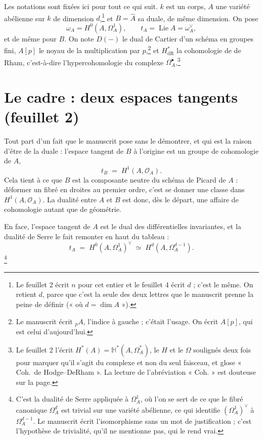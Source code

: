 \documentclass[11pt,a4paper]{article}
\begin{document}
Les notations sont fixées ici pour tout ce qui suit. $k$ est un corps, $A$ une
variété abélienne sur $k$ de dimension $d$,\footnote{Le feuillet 2 écrit $n$
pour cet entier et le feuillet 4 écrit $d$ ; c'est le même. On retient $d$,
parce que c'est la seule des deux lettres que le manuscrit prenne la peine de
définir (« où $d = \dim A$ »).} et $B = \widehat{A}$ sa duale, de même
dimension. On pose
\[
  \omega_A = H^0(A, \Omega^1_A), \qquad t_A = \operatorname{Lie} A = \omega_A^{\vee},
\]
et de même pour $B$. On note $D(-)$ le dual de Cartier d'un schéma en groupes
fini, $A[p]$ le noyau de la multiplication par $p$,\footnote{Le manuscrit écrit
${}_pA$, l'indice à gauche ; c'était l'usage. On écrit $A[p]$, qui est celui
d'aujourd'hui.} et $H^{*}_{\mathrm{dR}}$ la cohomologie de de Rham, c'est-à-dire
l'hypercohomologie du complexe $\Omega^{\bullet}_A$.\footnote{Le feuillet 2
l'écrit $H^{*}(A) = \mathbb{H}^{*}(A, \Omega^{*}_A)$, le $H$ et le $\Omega$
soulignés deux fois pour marquer qu'il s'agit du complexe et non du seul
faisceau, et glose « Coh.\ de Hodge--DeRham ». La lecture de l'abréviation
« Coh. » est douteuse sur la page.}

\section*{Le cadre : deux espaces tangents (feuillet 2)}

Tout part d'un fait que le manuscrit pose sans le démontrer, et qui est la
raison d'être de la duale : l'espace tangent de $B$ à l'origine est un groupe
de cohomologie de $A$,
\[
  t_B \;=\; H^1(A, \mathcal{O}_A).
\]
Cela tient à ce que $B$ est la composante neutre du schéma de Picard de $A$ :
déformer un fibré en droites au premier ordre, c'est se donner une
classe dans $H^1(A, \mathcal{O}_A)$. La dualité entre $A$ et $B$ est donc, dès
le départ, une affaire de cohomologie autant que de géométrie.

En face, l'espace tangent de $A$ est le dual des différentielles invariantes,
et la dualité de Serre le fait remonter en haut du tableau :
\[
  t_A \;=\; H^0(A, \Omega^1_A)^{\vee} \;\simeq\; H^d(A, \Omega^{d-1}_A).
\]
\footnote{C'est la dualité de Serre appliquée à $\Omega^1_A$, où l'on se sert
de ce que le fibré canonique $\Omega^d_A$ est trivial sur une variété
abélienne, ce qui identifie $(\Omega^1_A)^{\vee}$ à $\Omega^{d-1}_A$. Le
manuscrit écrit l'isomorphisme sans un mot de justification ; c'est l'hypothèse de
trivialité, qu'il ne mentionne pas, qui le rend vrai.}
\end{document}
